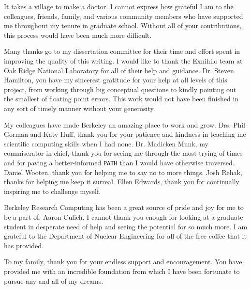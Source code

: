 \documentclass{ucbthesis}
\begin{document}
\begin{frontmatter}


\setcounter{secnumdepth}{3}
\setcounter{tocdepth}{3}


\tableofcontents
\clearpage
\listoffigures
\clearpage
\listoftables

\begin{acknowledgements}
\small
It takes a village to make a doctor. I cannot express how grateful I am to
the colleagues, friends, family, and various community members who have
supported me throughout my tenure in graduate school. Without all of your
contributions, this process would have been much more difficult.

Many thanks go to my dissertation committee for their time and effort spent
in improving the quality of this writing. I would like to thank the Exnihilo
team at Oak Ridge National Laboratory for all of their help and guidance.
Dr. Steven Hamilton, you have my sincerest gratitude for your help at all
levels of this project, from working through big conceptual questions to
kindly pointing out the smallest of floating point errors. This work would
not have been finished in any sort of timely manner without your generosity.

My colleagues have made Berkeley an amazing place to work and grow. Drs.
Phil Gorman and Katy Huff, thank you for your patience and kindness in
teaching me scientific computing skills when I had none. Dr. Madicken Munk,
my commiserator-in-chief, thank you for seeing me through the most trying
of times and for paving a better-informed \texttt{PATH} than I would have
otherwise traversed. Daniel Wooten, thank you for helping me to say no
to more things. Josh Rehak, thanks for helping me keep it surreal. Ellen
Edwards, thank you for continually inspiring me to challenge myself.

Berkeley Research Computing has been a great source of pride and joy for me
to be a part of. Aaron Culich, I cannot thank you enough for looking at a
graduate student in desperate need of help and seeing the potential for so
much more. I am grateful to the Department of Nuclear Engineering for all of
the free coffee that it has provided.

To my family, thank you for your endless support and encouragement. You have
provided me with an incredible foundation from which I have been fortunate
to pursue any and all of my dreams.


\end{acknowledgements}
\end{frontmatter}
\end{document}
